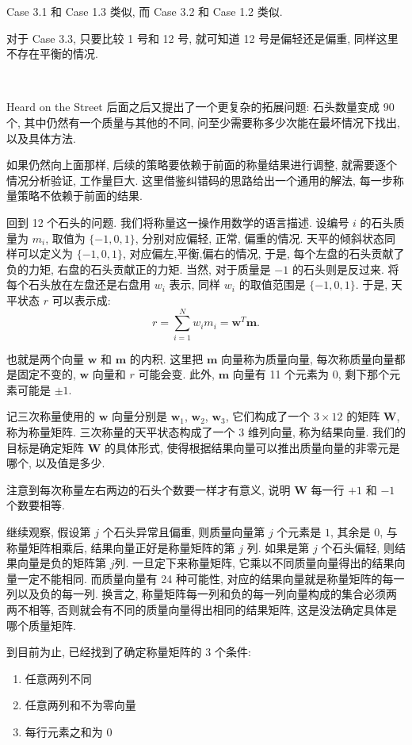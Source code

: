 Case 3.1 和 Case 1.3 类似, 而 Case 3.2 和 Case 1.2 类似. 

对于 Case 3.3, 只要比较 1 号和 12 号, 就可知道 12 号是偏轻还是偏重, 同样这里不存在平衡的情况.

~

Heard on the Street 后面之后又提出了一个更复杂的拓展问题: 石头数量变成 90 个, 其中仍然有一个质量与其他的不同, 问至少需要称多少次能在最坏情况下找出, 以及具体方法.

如果仍然向上面那样, 后续的策略要依赖于前面的称量结果进行调整, 就需要逐个情况分析验证, 工作量巨大. 这里借鉴纠错码的思路给出一个通用的解法, 每一步称量策略不依赖于前面的结果.

回到 12 个石头的问题. 我们将称量这一操作用数学的语言描述. 设编号 $ i $ 的石头质量为 $ m_i $, 取值为 $ \{-1,0,1\} $, 分别对应偏轻, 正常, 偏重的情况. 天平的倾斜状态同样可以定义为 $ \{-1, 0, 1\} $, 对应偏左,平衡,偏右的情况, 于是, 每个左盘的石头贡献了负的力矩, 右盘的石头贡献正的力矩. 当然, 对于质量是 $-1$ 的石头则是反过来. 将每个石头放在左盘还是右盘用 $ w_i $ 表示, 同样 $w_i$ 的取值范围是 $ \{-1, 0, 1\} $. 于是, 天平状态 $ r $ 可以表示成:
\[ r = \sum_{i=1}^N{w_im_i} = \boldsymbol{w}^T\boldsymbol{m} .\]

也就是两个向量 $ \boldsymbol{w} $ 和 $ \boldsymbol{m} $ 的内积.
这里把 $ \boldsymbol{m} $ 向量称为质量向量, 每次称质量向量都是固定不变的, $ \boldsymbol{w} $ 向量和 $ r $ 可能会变. 此外, $ \boldsymbol{m} $ 向量有 11 个元素为 0, 剩下那个元素可能是 $\pm{1}$.

记三次称量使用的 $ \boldsymbol{w} $ 向量分别是 $ \boldsymbol{w}_1 $, $ \boldsymbol{w}_2 $, $ \boldsymbol{w}_3 $, 它们构成了一个 $ 3\times 12 $ 的矩阵 $ \mathbf{W} $, 称为称量矩阵. 三次称量的天平状态构成了一个 3 维列向量, 称为结果向量. 我们的目标是确定矩阵 $ \mathbf{W} $ 的具体形式, 使得根据结果向量可以推出质量向量的非零元是哪个, 以及值是多少. 

注意到每次称量左右两边的石头个数要一样才有意义, 说明 $ \mathbf{W} $ 每一行 $+1$ 和 $-1$ 个数要相等.

继续观察, 假设第 $ j $ 个石头异常且偏重, 则质量向量第 $ j $ 个元素是 $ 1 $, 其余是 $0$, 与称量矩阵相乘后, 结果向量正好是称量矩阵的第 $ j $ 列. 如果是第 $ j $ 个石头偏轻, 则结果向量是负的矩阵第 $ j $列. 一旦定下来称量矩阵, 它乘以不同质量向量得出的结果向量一定不能相同. 而质量向量有 24 种可能性, 对应的结果向量就是称量矩阵的每一列以及负的每一列. 换言之, 称量矩阵每一列和负的每一列向量构成的集合必须两两不相等, 否则就会有不同的质量向量得出相同的结果矩阵, 这是没法确定具体是哪个质量矩阵.

到目前为止, 已经找到了确定称量矩阵的 3 个条件:
\begin{enumerate}
\item 任意两列不同
\item 任意两列和不为零向量
\item 每行元素之和为 0
\end{enumerate}

